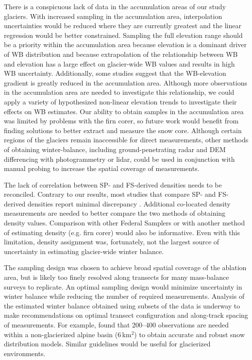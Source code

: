 \documentclass{sfuthesis}
\begin{document}
There is a conspicuous lack of data in the accumulation areas of our study glaciers. With increased sampling in the accumulation area, interpolation uncertainties would be reduced where they are currently greatest and the linear regression would be better constrained. Sampling the full elevation range should be a priority within the accumulation area because elevation is a dominant driver of WB distribution and because extrapolation of the relationship between WB and elevation has a large effect on glacier-wide WB values and results in high WB uncertainty. Additionally, some studies suggest that the WB-elevation gradient is greatly reduced in the accumulation area. Although more observations in the accumulation area are needed to investigate this relationship, we could apply a variety of hypothesized non-linear elevation trends to investigate their effects on WB estimates. Our ability to obtain samples in the accumulation area was limited by problems with the firn corer, so future work would benefit from finding solutions to better extract and measure the snow core. Although certain regions of the glaciers remain inaccessible for direct measurements, other methods of obtaining winter-balance, including ground-penetrating radar and DEM differencing with photogrammetry or lidar, could be used in conjunction with manual probing to increase the spatial coverage of measurements.

The lack of correlation between SP- and FS-derived densities needs to be reconciled. Contrary to our results, most studies that compare SP- and FS-derived densities report minimal discrepancy \citep[e.g.][and sources within]{Dixon2012}. Additional co-located density measurements are needed to better compare the two methods of obtaining density values. Comparison with other Federal Samplers or with another method of estimating density (e.g. firn corer) would also be informative. Even with this limitation, density assignment was, fortunately, not the largest source of uncertainty in estimating glacier-wide winter balance. 

The sampling design was chosen to achieve broad spatial coverage of the ablation area, but is likely too finely resolved along transects for many mass-balance surveys to replicate. An optimal sampling design would minimize uncertainty in winter balance while reducing the number of required measurements. Analysis of the estimated winter balance obtained using subsets of the data is underway to make recommendations on optimal transect configuration and along-track spacing of measurements. For example, \cite{Lopez2010} found that 200--400 observations are needed within a non-glacierized alpine basin (6\,km$^2$) to obtain accurate and robust snow distribution models. Similar guidelines would be useful for glacierized environments.
\end{document}
